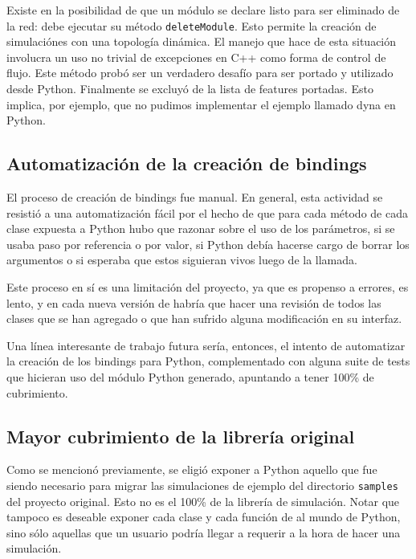 Existe en \omnetpp{} la posibilidad de que un módulo se declare listo para ser
eliminado de la red: debe ejecutar su método \verb!deleteModule!. Esto permite la
creación de simulaciónes con una topología dinámica. El manejo que hace \omnetpp{}
de esta situación involucra un uso no trivial de excepciones en C++ como forma
de control de flujo. Este método probó ser un verdadero desafío para ser
portado y utilizado desde Python. Finalmente se excluyó de la lista de features
portadas. Esto implica, por ejemplo, que no pudimos implementar el ejemplo
llamado dyna en Python.

\subsection{Automatización de la creación de bindings}

El proceso de creación de bindings fue manual. En general, esta actividad se
resistió a una automatización fácil por el hecho de que para cada método de
cada clase expuesta a Python hubo que razonar sobre el uso de los parámetros,
si se usaba paso por referencia o por valor, si Python debía hacerse cargo de
borrar los argumentos o si \omnetpp{} esperaba que estos siguieran vivos luego de
la llamada.

Este proceso en sí es una limitación del proyecto, ya que es propenso a
errores, es lento, y en cada nueva versión de \omnetpp{} habría que hacer una
revisión de todos las clases que se han agregado o que han sufrido alguna
modificación en su interfaz.

Una línea interesante de trabajo futura sería, entonces, el intento de
automatizar la creación de los bindings para Python, complementado con alguna
suite de tests que hicieran uso del módulo Python generado, apuntando a tener
100\% de cubrimiento.

\subsection{Mayor cubrimiento de la librería original}

Como se mencionó previamente, se eligió exponer a Python aquello que fue siendo
necesario para migrar las simulaciones de ejemplo del directorio \verb!samples! del
proyecto original. Esto no es el 100\% de la librería de simulación. Notar que
tampoco es deseable exponer cada clase y cada función de \omnetpp{} al mundo de
Python, sino sólo aquellas que un usuario podría llegar a requerir a la hora de
hacer una simulación.

